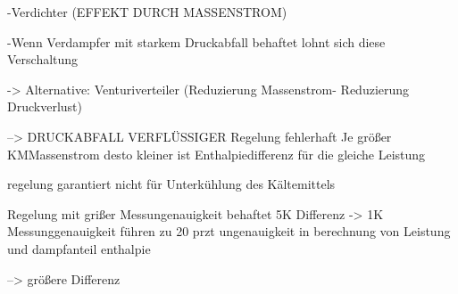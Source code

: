 -Verdichter (EFFEKT DURCH MASSENSTROM)

-Wenn Verdampfer mit starkem Druckabfall behaftet
lohnt sich diese Verschaltung

-> Alternative: Venturiverteiler (Reduzierung Massenstrom- Reduzierung Druckverlust)

--> DRUCKABFALL VERFLÜSSIGER
Regelung fehlerhaft
Je größer KMMassenstrom desto kleiner ist Enthalpiedifferenz für die gleiche Leistung 

regelung garantiert nicht für Unterkühlung des Kältemittels

Regelung mit grißer Messungenauigkeit behaftet
5K Differenz -> 1K Messunggenauigkeit führen zu 20 przt ungenauigkeit in berechnung von Leistung und dampfanteil enthalpie

--> größere  Differenz

\cite{Kulterer.2007}



